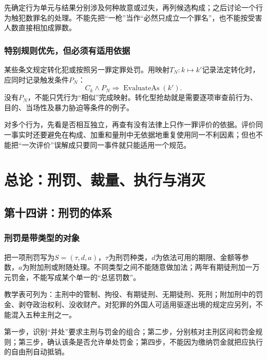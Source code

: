 先确定行为单元与结果分别涉及何种故意或过失，再列候选构成；之后讨论一个行为触犯数罪名的处理。不能先把“一枪”当作“必然只成立一个罪名”，也不能按受害人数直接相加成罪数。

\subsection{特别规则优先，但必须有适用依据}
某些条文规定转化犯或按照另一罪定罪处罚。用映射$T_N:k\mapsto k'$记录法定转化时，应同时记录触发条件$P_N$：
\[
 C_k\wedge P_N\Rightarrow\operatorname{EvaluateAs}(k').
\]
没有$P_N$，不能只凭行为“相似”完成映射。转化型抢劫就是需要逐项审查前行为、目的、当场性及暴力胁迫等条件的例子。

对多个行为，先看是否相互独立，再查有没有法律上只作一罪评价的依据。评价同一事实时还要避免在构成、加重和量刑中无依据地重复使用同一不利因素；但也不能把“一次评价”误解成只要同一事件就只能适用一个规范。


\chapter{总论：刑罚、裁量、执行与消灭}

\section{第十四讲：刑罚的体系}
\subsection{刑罚是带类型的对象}
把一项刑罚写为$S=(\tau,d,a)$，$\tau$为刑罚种类，$d$为依法可用的期限、金额等参数，$a$为附加刑或附随处理。不同类型之间不能随意做加法；两年有期徒刑加一万元罚金，不能写成某个单一的“总惩罚数”。


教学表可列为：主刑中的管制、拘役、有期徒刑、无期徒刑、死刑；附加刑中的罚金、剥夺政治权利、没收财产。对犯罪的外国人可适用驱逐出境的规定应另列，不能混入五种主刑之一。

第一步，识别“并处”要求主刑与罚金的组合；第二步，分别核对主刑区间和罚金规则；第三步，确认该条是否允许单处罚金；第四步，不能因为缴纳罚金就把应执行的自由刑自动抵销。

